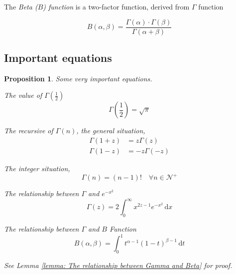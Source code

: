 \documentclass[a4paper]{article}
\newtheorem{proposition}{Proposition}[section]
\begin{document}
The \emph{Beta ($B$) function} is a two-factor function, derived from $\Gamma$ function

\begin{equation}
    B(\alpha, \beta) = \frac{\Gamma(\alpha) \cdot \Gamma(\beta)}{\Gamma(\alpha + \beta)}
\end{equation}

\subsection{Important equations}

\begin{proposition} \label{proposition: Gamma function propositions}
    Some very important equations.

    The value of $\Gamma(\frac{1}{2})$
    \begin{equation*}
        \Gamma(\frac{1}{2}) = \sqrt {\pi}
    \end{equation*}

    The recursive of $\Gamma(n)$, the general situation,
    \begin{equation*}
        \begin{aligned}
            \Gamma(1+z) & = z \Gamma(z)   \\
            \Gamma(1-z) & = -z \Gamma(-z)
        \end{aligned}
    \end{equation*}

    The integer situation,
    \begin{equation*}
        \Gamma(n) = (n-1)! \quad \forall n \in \mathcal{N}^+
    \end{equation*}

    The relationship between $\Gamma$ and $e^{-x^{2}}$
    \begin{equation*}
        \Gamma(z) = 2 \int_{0}^{\infty} x^{2z-1} e^{-x^{2}} \,\mathrm{d}x
    \end{equation*}

    The relationship between $\Gamma$ and $B$ Function
    \begin{equation*}
        B(\alpha, \beta) = \int_{0}^{1} t^{\alpha-1} (1-t)^{\beta-1} \,\mathrm{d}t
    \end{equation*}

    See Lemma \ref{lemma: The relationship between Gamma and Beta} for proof.

\end{proposition}

\newpage
\end{document}
